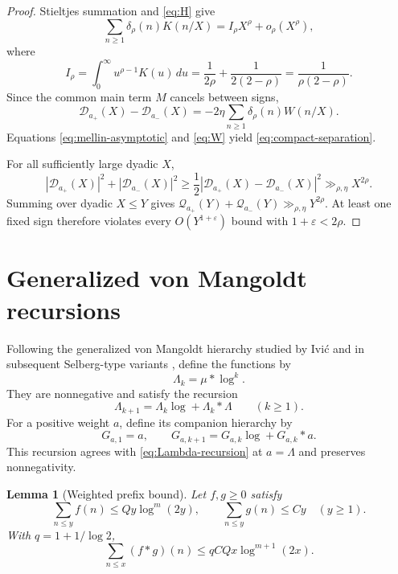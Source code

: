 \documentclass[11pt,a4paper]{amsart}
\newtheorem{lemma}[theorem]{Lemma}
\theoremstyle{definition}
\newcommand{\1}{\mathbf 1}
\begin{document}
\begin{proof}
Stieltjes summation and \eqref{eq:H} give
\begin{equation}\label{eq:mellin-asymptotic}
 \sum_{n\ge1}\delta_\rho(n)K(n/X)
 =I_\rho X^\rho+o_\rho(X^\rho),
\end{equation}
where
\[
 I_\rho=\int_0^\infty u^{\rho-1}K(u)\,du
 =\frac1{2\rho}+\frac1{2(2-\rho)}
 =\frac1{\rho(2-\rho)}.
\]
Since the common main term $M$ cancels between signs,
\[
 \mathcal D_{a_+}(X)-\mathcal D_{a_-}(X)
 =-2\eta\sum_{n\ge1}\delta_\rho(n)W(n/X).
\]
Equations \eqref{eq:mellin-asymptotic} and \eqref{eq:W} yield
\eqref{eq:compact-separation}.

For all sufficiently large dyadic $X$,
\[
 |\mathcal D_{a_+}(X)|^2+|\mathcal D_{a_-}(X)|^2
 \ge\frac12|\mathcal D_{a_+}(X)-\mathcal D_{a_-}(X)|^2
 \gg_{\rho,\eta}X^{2\rho}.
\]
Summing over dyadic $X\le Y$ gives
$\mathcal Q_{a_+}(Y)+\mathcal Q_{a_-}(Y)\gg_{\rho,\eta}Y^{2\rho}$.
At least one fixed sign therefore violates every $O(Y^{1+\varepsilon})$ bound with
$1+\varepsilon<2\rho$.
\end{proof}

\section{Generalized von Mangoldt recursions}\label{sec:hierarchy}

Following the generalized von Mangoldt hierarchy studied by Ivi\'c and in
subsequent Selberg-type variants \cite{Ivic1975,CalderonGarciaZarate1990,BanksSinha2025}, define
the functions by
\begin{equation}\label{eq:Lambda-k}
 \Lambda_k=\mu*\log^k.
\end{equation}
They are nonnegative and satisfy the recursion
\begin{equation}\label{eq:Lambda-recursion}
 \Lambda_{k+1}=\Lambda_k\log+\Lambda_k*\Lambda
 \qquad(k\ge1).
\end{equation}
For a positive weight $a$, define its companion hierarchy by
\begin{equation}\label{eq:G-recursion}
 G_{a,1}=a,
 \qquad
 G_{a,k+1}=G_{a,k}\log+G_{a,k}*a.
\end{equation}
This recursion agrees with \eqref{eq:Lambda-recursion} at $a=\Lambda$ and preserves nonnegativity.

\begin{lemma}[Weighted prefix bound]\label{lem:prefix}
Let $f,g\ge0$ satisfy
\[
 \sum_{n\le y}f(n)\le Qy\log^m(2y),
 \qquad
 \sum_{n\le y}g(n)\le Cy
 \quad(y\ge1).
\]
With $q=1+1/\log2$,
\[
 \sum_{n\le x}(f*g)(n)
 \le qCQx\log^{m+1}(2x).
\]
\end{lemma}
\end{document}

